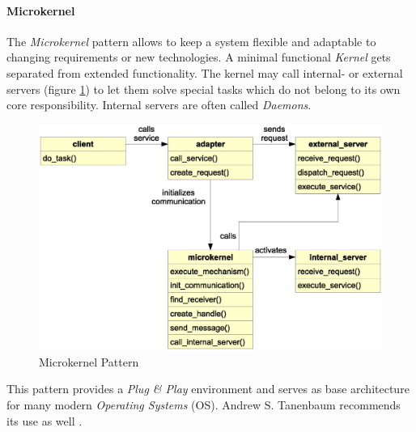 %
%
%
%
%
%
%

\paragraph{Microkernel}
\label{microkernel_heading}

The \emph{Microkernel} pattern \cite{buschmann} allows to keep a system flexible
and adaptable to changing requirements or new technologies. A minimal functional
\emph{Kernel} gets separated from extended functionality. The kernel may call
internal- or external servers (figure \ref{microkernel_figure}) to let them
solve special tasks which do not belong to its own core responsibility. Internal
servers are often called \emph{Daemons}.

\begin{figure}[ht]
    \begin{center}
        \includegraphics[scale=0.3]{vector/microkernel.eps}
        \caption{Microkernel Pattern}
        \label{microkernel_figure}
    \end{center}
\end{figure}

This pattern provides a \emph{Plug \& Play} environment and serves as base
architecture for many modern \emph{Operating Systems} (OS). Andrew S. Tanenbaum
recommends its use as well \cite{tanenbaum2001}.
